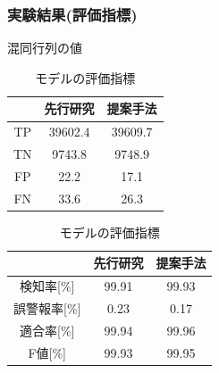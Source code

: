 \documentclass[11pt,dvipdfmx,cjk]{beamer}
\begin{document}
\begin{frame}
  \frametitle{実験結果(評価指標)}
  



  \begin{table}[h]
    \centering
    \begin{minipage}{0.48\textwidth}  %
      \scriptsize
        \centering
        \caption{混同行列の値}  %
        \begin{tabular}{|c|c|c|}  %
            \hline  %
            ~ &先行研究 & 提案手法\\  %
            \hline  %
            TP & 39602.4 & 39609.7\\  %
            \hline  %
            TN & 9743.8 & 9748.9\\  %
            \hline  %
            FP & 22.2 & 17.1\\  %
            \hline  %
            FN & 33.6 & 26.3\\  %
            \hline  %
        \end{tabular}
        \label{result2}  %
    \end{minipage} \hspace{0.2cm}  %
    \begin{minipage}{0.48\textwidth}  %
      \scriptsize
        \centering
        \caption{モデルの評価指標}  %
        \begin{tabular}{|c|c|c|}  %
            \hline  %
            ~ &先行研究 & 提案手法\\  %
            \hline  %
            検知率[\%] & 99.91 & 99.93\\  %
            \hline  %
            誤警報率[\%] & 0.23 & 0.17\\  %
            \hline  %
            適合率[\%] & 99.94 & 99.96\\  %
            \hline  %
            F値[\%] & 99.93 & 99.95\\  %
            \hline  %
        \end{tabular}
        \label{result3}  %
    \end{minipage}
  \end{table}
\end{frame}
\end{document}
